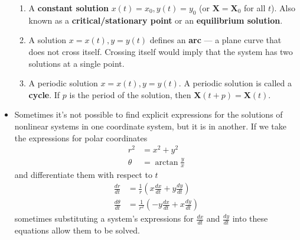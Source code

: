 \documentclass{article}
\begin{document}
\begin{itemize}
        \begin{enumerate}
          \item A \textbf{constant solution} $x(t) = x_0, y(t) = y_0$ (or $\mathbf{X} = \mathbf{X}_0$ for all $t$). Also known as a \textbf{critical/stationary point} or an \textbf{equilibrium solution}.

          \item A solution $x = x(t), y = y(t)$ defines an \textbf{arc} — a plane curve that does not cross itself. Crossing itself would imply that the system has two solutions at a single point.

          \item A periodic solution $x = x(t), y = y(t)$. A periodic solution is called a \textbf{cycle}. If $p$ is the period of the solution, then $\mathbf{X}(t + p) = \mathbf{X}(t)$.
        \end{enumerate}

  \item Sometimes it's not possible to find explicit expressions for the solutions of nonlinear systems in one coordinate system, but it is in another. If we take the expressions for polar coordinates \begin{align*}
          r^2    & = x^2 + y^2           \\
          \theta & = \arctan \frac{y}{x}
        \end{align*} and differentiate them with respect to $t$ \begin{align*}
          \frac{d r}{d t}      & = \frac{1}{r} \left( x \frac{d x}{d t} + y \frac{d y}{d t} \right)    \\
          \frac{d \theta}{d t} & = \frac{1}{r^2} \left( -y \frac{d x}{d t} + x \frac{d y}{d t} \right)
        \end{align*} sometimes substituting a system's expressions for $\frac{d x}{d t}$ and $\frac{d y}{d t}$ into these equations allow them to be solved.
\end{itemize}
\end{document}
